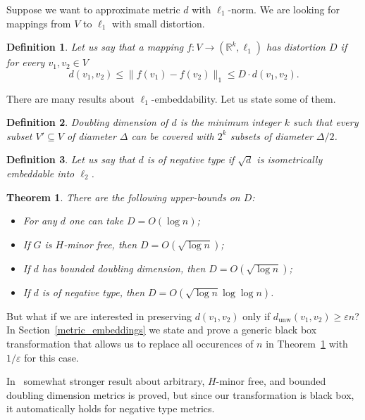 \documentclass[12pt]{article}
\newcommand{\dunw}{d_{\mathrm{unw}}}
\newcommand{\eps}{\varepsilon}
\newtheorem{definition}{Definition}
\newtheorem{theorem}{Theorem}
\begin{document}
    Suppose we want to approximate metric $d$ with $\ell_1$-norm. We are looking for mappings from $V$ to $\ell_1$ with small distortion. 
    \begin{definition}
        Let us say that a mapping $f \colon V \to (\mathbb{R}^k, \ell_1)$ has distortion $D$ if for every $v_1, v_2 \in V$
        $$
            d(v_1, v_2) \leq \|f(v_1) - f(v_2)\|_1 \leq D \cdot d(v_1, v_2).
        $$
    \end{definition}

    There are many results about $\ell_1$-embeddability. Let us state some of them.

    \begin{definition}
        Doubling dimension of $d$ is the minimum integer $k$ such that every subset $V' \subseteq V$ of diameter $\Delta$
        can be covered with $2^k$ subsets of diameter $\Delta / 2$.
    \end{definition}

    \begin{definition}
        Let us say that $d$ is of negative type if $\sqrt{d}$ is isometrically embeddable into $\ell_2$.
    \end{definition}

    \begin{theorem}
        \label{l1_embeddings}
        There are the following upper-bounds on $D$:
        \begin{itemize}
            \item \cite{B85} For any $d$ one can take $D = O(\log n)$;
            \item \cite{R99} If $G$ is $H$-minor free, then $D = O(\sqrt{\log n})$; 
            \item \cite{GKL03} If $d$ has bounded doubling dimension, then $D = O(\sqrt{\log n})$;
            \item \cite{ALN05} If $d$ is of negative type, then $D = O(\sqrt{\log n} \log \log n)$. 
        \end{itemize}
    \end{theorem}

    But what if we are interested in preserving $d(v_1, v_2)$ only if $\dunw(v_1, v_2) \geq \eps n$?
    In Section~\ref{metric_embeddings} we state and prove a generic black box transformation
    that allows us to replace all occurences of $n$ in Theorem~\ref{l1_embeddings} with $1 / \eps$ for this case.

    In~\cite{ABCDGKNS05} somewhat stronger result about arbitrary, $H$-minor free, and bounded doubling dimension metrics is proved, but since our transformation
    is black box, it automatically holds for negative type metrics.
\end{document}
